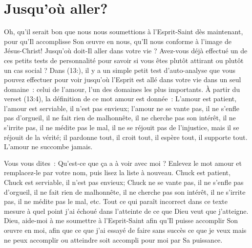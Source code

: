 \section{Jusqu'o\`u aller?}

Oh, qu'il serait bon que nous nous soumettions à l'Esprit-Saint
 dès maintenant, pour qu'Il accomplisse Son œuvre en nous,
 qu'Il nous conforme à l'image de Jésus-Christ!
 Jusqu'où doit-Il aller dans votre vie ?
 Avez-vous déjà effectué un de ces petits tests de personnalité pour savoir
 si vous êtes plutôt attirant ou plutôt un cas social ?
 Dans (13:), il y a un simple petit test d'auto-analyse
 que vous pouvez effectuer pour voir jusqu'où l'Esprit est allé
 dans votre vie dans un seul domaine~: celui de l'amour,
 l'un des domaines les plus importants.
 À partir du verset (13:4), la définition
 de ce mot \og amour \fg{} est donnée~:
 \og L'amour est patient, l'amour est serviable, il n'est pas envieux;
 l'amour ne se vante pas, il ne s'enfle pas d'orgueil,
 il ne fait rien de malhonnête, il ne cherche pas son intérêt,
 il ne s'irrite pas, il ne médite pas le mal, il ne se réjouit pas
 de l'injustice, mais il se réjouit de la vérité; il pardonne tout,
 il croit tout, il espère tout, il supporte tout.
 L'amour ne succombe jamais. \fg{}

Vous vous dites~:
 \og Qu'est-ce que ça a à voir avec moi ? \fg{}
 Enlevez le mot \og amour \fg{} et remplacez-le par votre nom,
 puis lisez la liste à nouveau.
 \og Chuck est patient, Chuck est serviable, il n'est pas envieux;
 Chuck ne se vante pas, il ne s'enfle pas d'orgueil, il ne fait rien
 de malhonnête, il ne cherche pas son intérêt, il ne s'irrite pas,
 il ne médite pas le mal, etc. \fg{}
 Tout ce qui paraît incorrect dans ce texte mesure à quel point j'ai échoué
 dans l'atteinte de ce que Dieu veut que j'atteigne.
 Dieu, aide-moi à me soumettre à l'Esprit-Saint afin qu'Il puisse accomplir
 Son œuvre en moi, afin que ce que j'ai essayé de faire sans succès
 \ocadr ce que je veux mais ne peux accomplir ou atteindre \fcadr
 soit accompli pour moi par Sa puissance.
\closechapter

